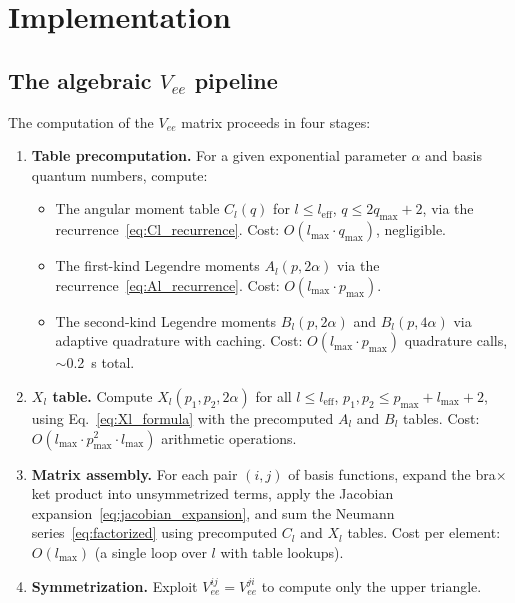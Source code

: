 \documentclass[aps,pra,twocolumn,superscriptaddress,longbibliography]{revtex4-2}
\begin{document}

\section{Implementation}
\label{sec:implementation}

\subsection{The algebraic \texorpdfstring{$V_{ee}$}{Vee} pipeline}

The computation of the $V_{ee}$ matrix proceeds in four stages:

\begin{enumerate}
  \item \textbf{Table precomputation.}  For a given exponential
    parameter $\alpha$ and basis quantum numbers, compute:
    \begin{itemize}
      \item The angular moment table $C_l(q)$ for $l \leq l_{\mathrm{eff}}$,
        $q \leq 2q_{\max} + 2$, via the recurrence~\eqref{eq:Cl_recurrence}.
        Cost: $O(l_{\max} \cdot q_{\max})$, negligible.
      \item The first-kind Legendre moments $A_l(p, 2\alpha)$ via
        the recurrence~\eqref{eq:Al_recurrence}.  Cost: $O(l_{\max} \cdot p_{\max})$.
      \item The second-kind Legendre moments $B_l(p, 2\alpha)$ and
        $B_l(p, 4\alpha)$ via adaptive quadrature with caching.
        Cost: $O(l_{\max} \cdot p_{\max})$ quadrature calls, $\sim$0.2~s total.
    \end{itemize}
  \item \textbf{$X_l$ table.}  Compute
    $X_l(p_1, p_2, 2\alpha)$ for all
    $l \leq l_{\mathrm{eff}}$, $p_1, p_2 \leq p_{\max}+l_{\max}+2$,
    using Eq.~\eqref{eq:Xl_formula} with the precomputed
    $A_l$ and $B_l$ tables.  Cost: $O(l_{\max} \cdot p_{\max}^2
    \cdot l_{\max})$ arithmetic operations.
  \item \textbf{Matrix assembly.}  For each pair $(i, j)$ of
    basis functions, expand the bra$\times$ket product into
    unsymmetrized terms, apply the Jacobian
    expansion~\eqref{eq:jacobian_expansion}, and sum the
    Neumann series~\eqref{eq:factorized} using precomputed
    $C_l$ and $X_l$ tables.  Cost per element: $O(l_{\max})$
    (a single loop over $l$ with table lookups).
  \item \textbf{Symmetrization.}  Exploit $V_{ee}^{ij} = V_{ee}^{ji}$
    to compute only the upper triangle.
\end{enumerate}
\end{document}
